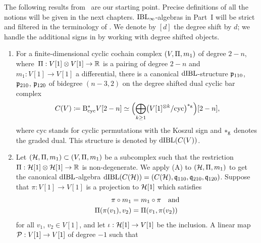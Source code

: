 \documentclass[\MainFolder/Text.tex]{subfiles}
\begin{document}
The following results from~\cite[Corollary~11.9]{Cieliebak2015} are our starting point.
Precise definitions of all the notions will be given in the next chapters.
$\mathrm{IBL}_\infty$-algebras in Part~I will be strict and filtered in the terminology of \cite{Cieliebak2015}.
We denote by $[d]$ the degree shift by $d$; we handle the additional signs in \cite{Cieliebak2015} by working with degree shifted objects.
%
\begin{enumerate}[listparindent=\parindent,label=\textbf{(\Alph*)}]
\item For a finite-dimensional cyclic cochain complex $(V,\Pi,m_1)$ of degree $2-n$, where~$\Pi: V[1]\otimes V[1]\rightarrow\mathbb{R}$ is a pairing of degree $2-n$ and $m_1: V[1] \rightarrow V[1]$ a differential,
there is a canonical $\mathrm{dIBL}$-structure $\mathfrak{p}_{110}$, $\mathfrak{p}_{210}$, $\mathfrak{p}_{120}$ of bidegree $(n-3,2)$ on the degree shifted dual cyclic bar complex
\[ C(V)\coloneqq \mathrm{B}_{\mathrm{cyc}}^* V[2-n] \simeq \Bigl(\bigoplus_{k\ge 1} \bigl(V[1]^{\otimes k} / \text{cyc}\bigr)^{*_{\mathrm{g}}} \Bigr)[2-n], \]
where $\mathrm{cyc}$ stands for cyclic permutations with the Koszul sign and $*_{\mathrm{g}}$ denotes the graded dual.
This structure is denoted by $\mathrm{dIBL}(C(V))$.
\item Let $(\mathcal{H},\Pi,m_1) \subset (V,\Pi,m_1)$ be a subcomplex such that the restriction $\Pi: \mathcal{H}[1]\otimes\mathcal{H}[1]\rightarrow\mathbb{R}$ is non-degenerate. We apply (A) to $(\mathcal{H},\Pi,m_1)$ to get the canonical $\mathrm{dIBL}$-algebra $\mathrm{dIBL}(C(\mathcal{H})) = (C(\mathcal{H}),\mathfrak{q}_{110},\mathfrak{q}_{210},\mathfrak{q}_{120})$. 
Suppose that $\pi: V[1] \rightarrow V[1]$ is a projection to $\mathcal{H}[1]$ which satisfies
\begin{equation*}
 \begin{aligned}
 \pi \circ m_1 &= m_1 \circ \pi \quad\text{and}\\ \Pi(\pi(v_1),v_2) &= \Pi(v_1,\pi(v_2))
\end{aligned}
\end{equation*}
for all $v_1$, $v_2 \in V[1]$, and let $\iota: \mathcal{H}[1]\rightarrow V[1]$ be the inclusion. A linear map $\mathcal{P}: V[1]\rightarrow V[1]$ of degree $-1$ such that
\begin{equation}\label{Eq:ConditionOnG}
\begin{aligned}

\end{aligned}
\end{equation}
\end{enumerate}
\end{document}
